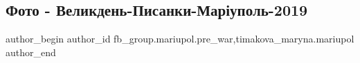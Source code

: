  
 
 
 
 

\subsection{Фото - Великдень-Писанки-Маріуполь-2019}
\label{sec:11_04_2023.fb.fb_group.mariupol.pre_war.2.single_foto_velykden_2019}
 
\ifcmt
 author_begin
   author_id fb_group.mariupol.pre_war,timakova_maryna.mariupol
 author_end
\fi

